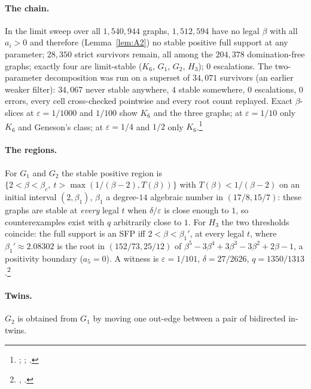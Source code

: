 \documentclass[11pt]{article}
\theoremstyle{definition}
\newcommand{\eps}{\varepsilon}
\begin{document}
\paragraph{The chain.} In the limit sweep over all $1{,}540{,}944$ graphs, $1{,}512{,}594$ have no legal $\beta$ with all
$a_i>0$ and therefore (Lemma~\ref{lem:A2}) no stable positive full support at any parameter; $28{,}350$ strict survivors
remain, all among the $204{,}378$ domination-free graphs; exactly four are limit-stable ($K_6$, $G_1$, $G_2$, $H_3$);
$0$ escalations. The two-parameter decomposition was run on a superset of $34{,}071$ survivors (an earlier weaker
filter): $34{,}067$ never stable anywhere, $4$ stable somewhere, $0$ escalations, $0$ errors, every cell cross-checked
pointwise and every root count replayed. Exact $\beta$-slices at $\eps=1/1000$ and $1/100$ show $K_6$ and the three
graphs; at $\eps=1/10$ only $K_6$ and Geneson's class; at $\eps=1/4$ and $1/2$ only $K_6$.\footnote{; ; .}

\paragraph{The regions.} For $G_1$ and $G_2$ the stable positive region is
$\{2<\beta<\beta_c,\ t>\max(1/(\beta-2),T(\beta))\}$ with $T(\beta)<1/(\beta-2)$ on an initial interval $(2,\beta_1)$,
$\beta_1$ a degree-$14$ algebraic number in $(17/8,15/7)$: these graphs are stable at \emph{every} legal $t$ when $\delta/\eps$
is close enough to $1$, so counterexamples exist with $q$ arbitrarily close to $1$. For $H_3$ the two thresholds
coincide: the full support is an SFP iff $2<\beta<\beta_1'$, at every legal $t$, where $\beta_1'\approx2.08302$ is the root
in $(152/73,25/12)$ of $\beta^5-3\beta^4+3\beta^3-3\beta^2+2\beta-1$, a positivity boundary ($a_5=0$). A witness is
$\eps=1/101$, $\delta=27/2626$, $q=1350/1313$.\footnote{, .}

\paragraph{Twins.} $G_2$ is obtained from $G_1$ by moving one out-edge between a pair of bidirected in-twins.
\end{document}
